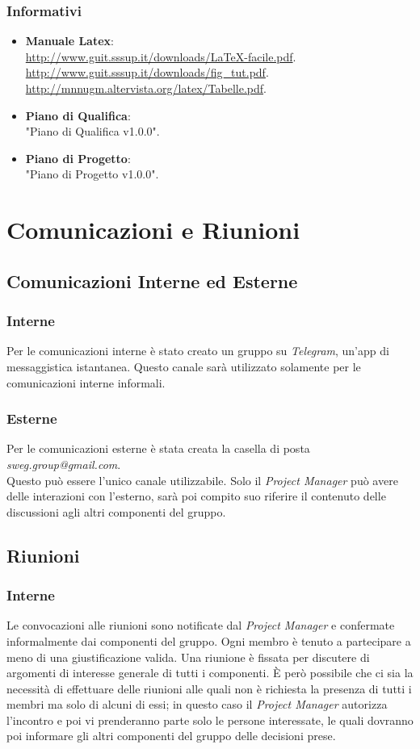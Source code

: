 \documentclass[12pt,a4paper,titlepage]{article}
\begin{document}
\subsubsection{Informativi}
\begin{itemize}
	\item \textbf{Manuale Latex}:\\
	\textcolor{blue}{\url{http://www.guit.sssup.it/downloads/LaTeX-facile.pdf}}.\\
	\textcolor{blue}{\url{http://www.guit.sssup.it/downloads/fig_tut.pdf}}.\\
	\textcolor{blue}{\url{http://mnnugm.altervista.org/latex/Tabelle.pdf}}.
	\item \textbf{Piano di Qualifica}:\\
	"Piano di Qualifica v1.0.0".
	\item \textbf{Piano di Progetto}:\\
	"Piano di Progetto v1.0.0".
\end{itemize}
\newpage
{}
\section{Comunicazioni e Riunioni}
\subsection{Comunicazioni Interne ed Esterne}
\subsubsection{Interne}
Per le comunicazioni interne è stato creato un gruppo su \textit{Telegram}, un'app di messaggistica istantanea. Questo canale sarà utilizzato solamente per le comunicazioni interne informali.
\subsubsection{Esterne}
Per le comunicazioni esterne è stata creata la casella di posta \textit{sweg.group@gmail.com}.\\ 
Questo può essere l'unico canale utilizzabile. Solo il \textit{Project Manager} può avere delle interazioni con l'esterno, sarà poi compito suo riferire il contenuto delle discussioni agli altri componenti del gruppo.
\subsection{Riunioni}
\subsubsection{Interne}
Le convocazioni alle riunioni sono notificate dal \textit{Project Manager} e confermate informalmente dai componenti del gruppo. Ogni membro è tenuto a partecipare a meno di una giustificazione valida. Una riunione è fissata per discutere di argomenti di interesse generale di tutti i componenti. È però possibile che ci sia la necessità di effettuare delle riunioni alle quali non è richiesta la presenza di tutti i membri ma solo di alcuni di essi; in questo caso il \textit{Project Manager} autorizza l'incontro e poi vi prenderanno parte solo le persone interessate, le quali dovranno poi informare gli altri componenti del gruppo delle decisioni prese.
\end{document}
